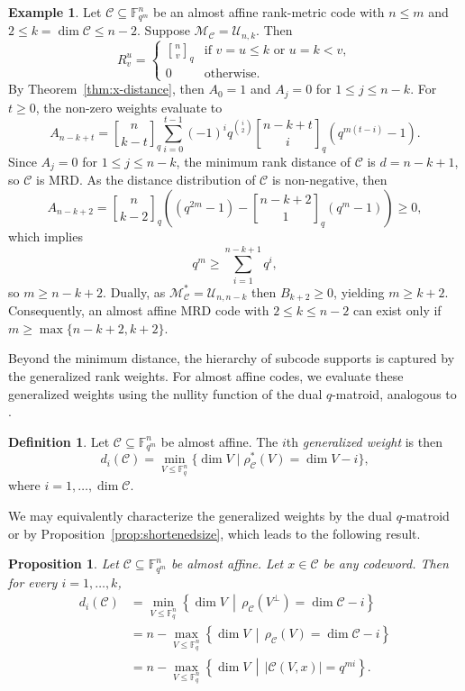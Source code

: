 \documentclass[a4paper,11pt,reqno]{article}
\newcommand{\F}{\mathbb{F}}
\newcommand{\M}{\mathcal{M}}
\newcommand{\C}{\mathcal{C}}
\newcommand{\qbinom}[2]{\genfrac[]{0pt}{0}{#1}{#2}}
\theoremstyle{plain} \numberwithin{equation}{section}
\newtheorem{proposition}[theorem]{Proposition}
\theoremstyle{definition}
\newtheorem{definition}[theorem]{Definition}
\newtheorem{example}[theorem]{Example}
\begin{document}
\begin{example}
Let $\C\subseteq \F_{q^m}^n$ be an almost affine rank-metric code with {$n\leq m$} and $2\leq k = \dim \C\leq n-2$. Suppose $\M_\C = \mathcal{U}_{n,k}$. Then 
\[
    R^u_v = \begin{cases}
        \qbinom{n}{v}_q & \text{if }v=u\leq k \text{ or } u=k<v, \\
        0 & \text{otherwise.}
    \end{cases}
\]
By Theorem~\ref{thm:x-distance}, then $A_0=1$ and $A_j=0$ for $1\leq j \leq n-k$. For $t\geq 0$, the non-zero weights evaluate to
\[
    A_{n-k+t} = \qbinom{n}{k-t}_q \sum^{t-1}_{i=0} (-1)^i q^{\binom{i}{2}}\qbinom{n-k+t}{i}_q(q^{m(t-i)}-1).
\]
Since $A_j = 0$ for $1\leq j \leq n-k$, the minimum rank distance of $\C$ is $d=n-k+1$, so $\C$ is MRD. As the distance distribution of $\C$ is non-negative, then
\[
    A_{n-k+2} = \qbinom{n}{k-2}_q\left((q^{2m}-1)- \qbinom{n-k+2}{1}_q(q^m-1) \right) \geq 0,
\]
which implies
\[
    q^{m}\geq \sum^{n-k+1}_{i=1}q^i,
\]
so $m\geq n-k+2$. Dually, as $\M_\C^* = \mathcal{U}_{n,n-k}$ then $B_{k+2}\geq 0$, yielding $m\geq k+2$. Consequently, an almost affine MRD code with $2\leq k \leq n-2$ can exist only if $m\geq \max\{n-k+2,k+2\}$.
\end{example}

Beyond the minimum distance, the hierarchy of subcode supports is captured by the generalized rank weights. For almost affine codes, we evaluate these generalized weights using the nullity function of the dual $q$-matroid, analogous to \cite{10.1109/TIT.2017.2654456}.

\begin{definition}
    Let $\C\subseteq \F_{q^m}^n$ be almost affine. The $i$th \emph{generalized weight} is then
    \[
        d_i(\C) = \min_{V\leq \F_q^n}\{\dim V \mid \rho_\C^*(V) = \dim V - i\},
    \]
    where $i = 1,\ldots,\dim \C$.
\end{definition}

We may equivalently characterize the generalized weights by the dual $q$-matroid or by Proposition~\ref{prop:shortenedsize}, which leads to the following result.

\begin{proposition}
Let $\C\subseteq \F_{q^m}^n$ be almost affine. Let $x\in \C$ be any codeword. Then for every $i=1,\ldots,k$,
\begin{align*}
    d_i(\C) &= \min_{V\leq \F_q^n}\left\{ \dim V \,\middle|\, \rho_\C(V^\perp) = \dim \C - i  \right\} \\
            &= n - \max_{V\leq \F_q^n}\left\{\dim V \,\middle|\, \rho_\C(V) = \dim \C -i\right \} \\
            &= n - \max_{V\leq \F_q^n}\left\{ \dim V \,\middle|\, |\C(V,x)| = q^{mi} \right\}.
\end{align*}
\end{proposition}
\end{document}
